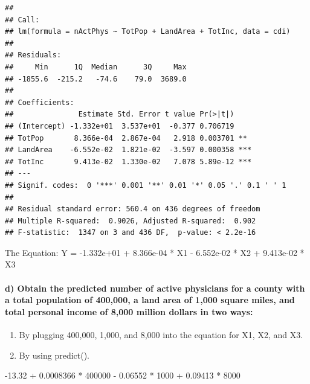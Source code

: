 \documentclass[
]{article}
\newenvironment{Shaded}{\begin{snugshade}}{\end{snugshade}}
\newcommand{\DecValTok}[1]{\textcolor[rgb]{0.00,0.00,0.81}{#1}}
\newcommand{\FloatTok}[1]{\textcolor[rgb]{0.00,0.00,0.81}{#1}}
\newcommand{\SpecialCharTok}[1]{\textcolor[rgb]{0.00,0.00,0.00}{#1}}
\providecommand{\tightlist}{%
  \setlength{\itemsep}{0pt}\setlength{\parskip}{0pt}}
\begin{document}
\begin{verbatim}
## 
## Call:
## lm(formula = nActPhys ~ TotPop + LandArea + TotInc, data = cdi)
## 
## Residuals:
##     Min      1Q  Median      3Q     Max 
## -1855.6  -215.2   -74.6    79.0  3689.0 
## 
## Coefficients:
##               Estimate Std. Error t value Pr(>|t|)    
## (Intercept) -1.332e+01  3.537e+01  -0.377 0.706719    
## TotPop       8.366e-04  2.867e-04   2.918 0.003701 ** 
## LandArea    -6.552e-02  1.821e-02  -3.597 0.000358 ***
## TotInc       9.413e-02  1.330e-02   7.078 5.89e-12 ***
## ---
## Signif. codes:  0 '***' 0.001 '**' 0.01 '*' 0.05 '.' 0.1 ' ' 1
## 
## Residual standard error: 560.4 on 436 degrees of freedom
## Multiple R-squared:  0.9026, Adjusted R-squared:  0.902 
## F-statistic:  1347 on 3 and 436 DF,  p-value: < 2.2e-16
\end{verbatim}

The Equation: Y = -1.332e+01 + 8.366e-04 * X1 - 6.552e-02 * X2 +
9.413e-02 * X3 \newpage

\hypertarget{d-obtain-the-predicted-number-of-active-physicians-for-a-county-with-a-total-population-of-400000-a-land-area-of-1000-square-miles-and-total-personal-income-of-8000-million-dollars-in-two-ways}{%
\paragraph{d) Obtain the predicted number of active physicians for a
county with a total population of 400,000, a land area of 1,000 square
miles, and total personal income of 8,000 million dollars in two
ways:}\label{d-obtain-the-predicted-number-of-active-physicians-for-a-county-with-a-total-population-of-400000-a-land-area-of-1000-square-miles-and-total-personal-income-of-8000-million-dollars-in-two-ways}}

\begin{enumerate}
\def\labelenumi{\arabic{enumi}.}
\tightlist
\item
  By plugging 400,000, 1,000, and 8,000 into the equation for X1, X2,
  and X3.
\item
  By using predict().
\end{enumerate}

\begin{Shaded}
\begin{Highlighting}[]
\SpecialCharTok{{-}}\FloatTok{13.32} \SpecialCharTok{+} \FloatTok{0.0008366} \SpecialCharTok{*} \DecValTok{400000} \SpecialCharTok{{-}} \FloatTok{0.06552} \SpecialCharTok{*} \DecValTok{1000} \SpecialCharTok{+} \FloatTok{0.09413} \SpecialCharTok{*} \DecValTok{8000}
\end{Highlighting}
\end{Shaded}
\end{document}
